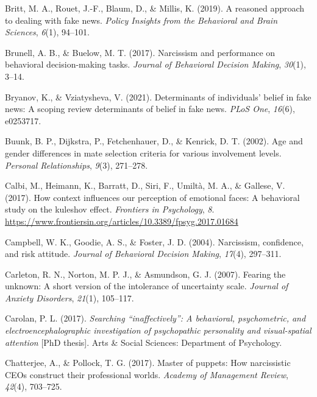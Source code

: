 \documentclass[
  man,floatsintext]{apa6}
\newlength{\cslhangindent}
\newlength{\cslentryspacingunit} %
\newenvironment{CSLReferences}[2] %
 {%
  \setlength{\parindent}{0pt}
  \ifodd #1
  \let\oldpar\par
  \def\par{\hangindent=\cslhangindent\oldpar}
  \fi
  \setlength{\parskip}{#2\cslentryspacingunit}
 }%
 {}
\begin{document}
\begin{CSLReferences}{1}{0}
\leavevmode{}%
Britt, M. A., Rouet, J.-F., Blaum, D., \& Millis, K. (2019). A reasoned approach to dealing with fake news. \emph{Policy Insights from the Behavioral and Brain Sciences}, \emph{6}(1), 94--101.

\leavevmode{}%
Brunell, A. B., \& Buelow, M. T. (2017). Narcissism and performance on behavioral decision-making tasks. \emph{Journal of Behavioral Decision Making}, \emph{30}(1), 3--14.

\leavevmode{}%
Bryanov, K., \& Vziatysheva, V. (2021). Determinants of individuals' belief in fake news: A scoping review determinants of belief in fake news. \emph{PLoS One}, \emph{16}(6), e0253717.

\leavevmode{}%
Buunk, B. P., Dijkstra, P., Fetchenhauer, D., \& Kenrick, D. T. (2002). Age and gender differences in mate selection criteria for various involvement levels. \emph{Personal Relationships}, \emph{9}(3), 271--278.

\leavevmode{}%
Calbi, M., Heimann, K., Barratt, D., Siri, F., Umiltà, M. A., \& Gallese, V. (2017). How context influences our perception of emotional faces: A behavioral study on the kuleshov effect. \emph{Frontiers in Psychology}, \emph{8}. \url{https://www.frontiersin.org/articles/10.3389/fpsyg.2017.01684}

\leavevmode{}%
Campbell, W. K., Goodie, A. S., \& Foster, J. D. (2004). Narcissism, confidence, and risk attitude. \emph{Journal of Behavioral Decision Making}, \emph{17}(4), 297--311.

\leavevmode{}%
Carleton, R. N., Norton, M. P. J., \& Asmundson, G. J. (2007). Fearing the unknown: A short version of the intolerance of uncertainty scale. \emph{Journal of Anxiety Disorders}, \emph{21}(1), 105--117.

\leavevmode{}%
Carolan, P. L. (2017). \emph{Searching {``inaffectively''}: A behavioral, psychometric, and electroencephalographic investigation of psychopathic personality and visual-spatial attention} {[}PhD thesis{]}. Arts \& Social Sciences: Department of Psychology.

\leavevmode{}%
Chatterjee, A., \& Pollock, T. G. (2017). Master of puppets: How narcissistic CEOs construct their professional worlds. \emph{Academy of Management Review}, \emph{42}(4), 703--725.


\end{CSLReferences}
\end{document}
